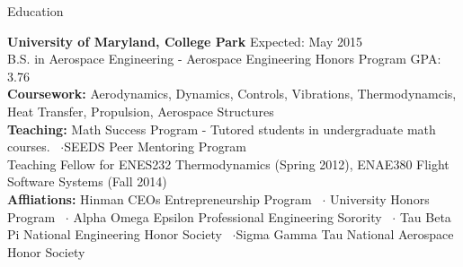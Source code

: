 \documentclass{resume} %
\begin{document}

\begin{rSection}{Education}

{\bf University of Maryland, College Park} \hfill { Expected: May 2015} \\
B.S. in Aerospace Engineering - Aerospace Engineering Honors Program \hfill {GPA: 3.76} \\
{\bf Coursework:} Aerodynamics, Dynamics, Controls, Vibrations, Thermodynamcis, Heat Transfer, Propulsion, Aerospace Structures\\
{\bf Teaching:} Math Success Program - Tutored students in undergraduate math courses. ~$\cdot$SEEDS Peer Mentoring Program \\
Teaching Fellow for ENES232 Thermodynamics (Spring 2012), ENAE380 Flight Software Systems (Fall 2014) \\
{\bf Affliations:} Hinman CEOs Entrepreneurship Program ~$\cdot$ University Honors Program ~$\cdot$  Alpha Omega Epsilon Professional Engineering Sorority ~$\cdot$ Tau Beta Pi National Engineering Honor Society ~$\cdot$Sigma Gamma Tau National Aerospace Honor Society\\
\end{rSection}

\end{document}

